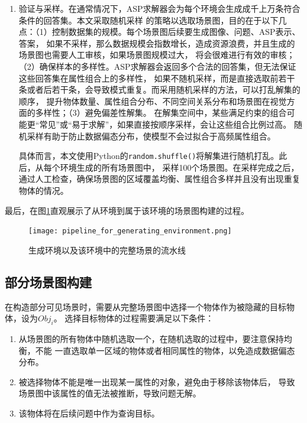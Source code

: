 \begin{enumerate}[itemsep=0pt,parsep=0pt]
\begin{lstlisting}
%物体的属性
at(0, 2).
has_property(0, color, green).
has_property(0, size, large).
has_property(0, material, rubber).
has_property(0, shape, cylinder).
....

%物体间的空间关系
front(1, 0). right(1, 0). ...
\end{lstlisting}
\item 验证与采样。在通常情况下，ASP求解器会为每个环境会生成成千上万条符合条件的回答集。本文采取随机采样
的策略以选取场景图，目的在于以下几点：（1）控制数据集的规模。每个场景图后续要生成图像、问题、ASP表示、答案，
如果不采样，那么数据规模会指数增长，造成资源浪费，并且生成的场景图也需要人工审核，如果场景图规模过大，
将会很难进行有效的审核；（2）确保样本的多样性。ASP求解器会返回多个合法的回答集，但无法保证这些回答集在属性组合上的多样性，
如果不随机采样，而是直接选取前若干条或者后若干条，会导致模式重复。而采用随机采样的方法，可以打乱解集的顺序，
提升物体数量、属性组合分布、不同空间关系分布和场景图在视觉方面的多样性；（3）避免偏差性解集。
在解集空间中，某些满足约束的组合可能更“常见”或“易于求解”，如果直接按顺序采样，会让这些组合比例过高。
随机采样有助于防止数据偏态分布，使模型不会过拟合于高频属性组合。

具体而言，本文使用Python的\texttt{random.shuffle()}将解集进行随机打乱。此后，从每个环境生成的所有场景图中，
采样100个场景图。在采样完成之后，通过人工检查，确保场景图的区域覆盖均衡、属性组合多样并且没有出现重复物体的情况。
\end{enumerate}

最后，在图\ref{pipeline_for_generating_environment}直观展示了从环境到属于该环境的场景图构建的过程。
\begin{figure}
    \centering
    \texttt{[image: pipeline\_for\_generating\_environment.png]}
    \caption{生成环境以及该环境中的完整场景的流水线}
    \label{pipeline_for_generating_environment}
\end{figure}
\subsection{部分场景图构建}
在构造部分可见场景时，需要从完整场景图中选择一个物体作为被隐藏的目标物体，设为$Obj_i$。
选择目标物体的过程需要满足以下条件：
\begin{enumerate}[itemsep=0pt,parsep=0pt]
\item 从场景图的所有物体中随机选取一个，在随机选取的过程中，要注意保持均衡，不能
一直选取单一区域的物体或者相同属性的物体，以免造成数据偏态分布。
\item 被选择物体不能是唯一出现某一属性的对象，避免由于移除该物体后，
导致场景图中该属性的值无法被推断，导致问题无解。
\item 该物体将在后续问题中作为查询目标。
\end{enumerate}

